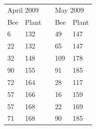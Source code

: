 \documentclass[11pt]{article}
\begin{document}
\begin{table}[h]
\centering
{}
\label{fig: calculationex}
\begin{tabular}{|l|l|lll}
\cline{1-2} \cline{4-5}
\multicolumn{2}{|l|}{\cellcolor[HTML]{EFEFEF}April 2009} & \multicolumn{1}{l|}{} & \multicolumn{2}{l|}{\cellcolor[HTML]{EFEFEF}May 2009} \\ \cline{1-2} \cline{4-5} 
\cellcolor[HTML]{EFEFEF}Bee & \cellcolor[HTML]{EFEFEF}Plant & \multicolumn{1}{l|}{} & \multicolumn{1}{l|}{\cellcolor[HTML]{EFEFEF}Bee} & \multicolumn{1}{l|}{\cellcolor[HTML]{EFEFEF}Plant} \\ \cline{1-2} \cline{4-5} 
\cellcolor[HTML]{E3E5F9}6 & 132 & \multicolumn{1}{l|}{} & \multicolumn{1}{l|}{49} & \multicolumn{1}{l|}{\cellcolor[HTML]{DDF4DC}147} \\ \cline{1-2} \cline{4-5} 
\cellcolor[HTML]{E3E5F9}22 & 132 & \multicolumn{1}{l|}{} & \multicolumn{1}{l|}{65} & \multicolumn{1}{l|}{\cellcolor[HTML]{DDF4DC}147} \\ \cline{1-2} \cline{4-5} 
32 & 148 & \multicolumn{1}{l|}{} & \multicolumn{1}{l|}{109} & \multicolumn{1}{l|}{178} \\ \cline{1-2} \cline{4-5} 
\cellcolor[HTML]{E3E5F9}90 & 155 & \multicolumn{1}{l|}{} & \multicolumn{1}{l|}{\cellcolor[HTML]{E3E5F9}91} & \multicolumn{1}{l|}{\cellcolor[HTML]{DDF4DC}185} \\ \cline{1-2} \cline{4-5} 
72 & 164 & \multicolumn{1}{l|}{} & \multicolumn{1}{l|}{28} & \multicolumn{1}{l|}{117} \\ \cline{1-2} \cline{4-5} 
57 & 166 & \multicolumn{1}{l|}{} & \multicolumn{1}{l|}{16} & \multicolumn{1}{l|}{159} \\ \cline{1-2} \cline{4-5} 
57 & \cellcolor[HTML]{DDF4DC}168 & \multicolumn{1}{l|}{} & \multicolumn{1}{l|}{\cellcolor[HTML]{E3E5F9}22} & \multicolumn{1}{l|}{169} \\ \cline{1-2} \cline{4-5} 
71 & \cellcolor[HTML]{DDF4DC}168 & \multicolumn{1}{l|}{} & \multicolumn{1}{l|}{\cellcolor[HTML]{E3E5F9}90} & \multicolumn{1}{l|}{\cellcolor[HTML]{DDF4DC}185} \\ \cline{1-2} \cline{4-5} 

\end{tabular}
\end{table}
\end{document}

